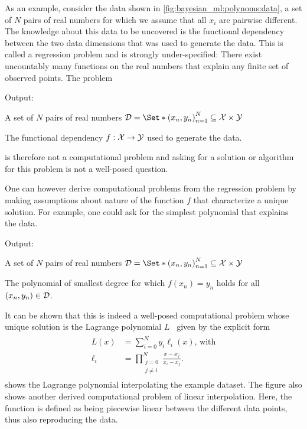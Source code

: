 As an example, consider the data shown in \cref{fig:bayesian_ml:polynoms:data}, a set of $N$ pairs of real numbers for which we assume that all $x_i$ are pairwise different.
The knowledge about this data to be uncovered is the functional dependency between the two data dimensions that was used to generate the data.
This is called a regression problem and is strongly under-specified:
There exist uncountably many functions on the real numbers that explain any finite set of observed points.
The problem
\begin{problem}[Regression]
\label{prob:bayesian_ml:regression}
\begin{labeling}{Output:}
    \item[Input:] A set of $N$ pairs of real numbers $\Dc = \Set*{\left(x_n, y_n\right)}_{n=1}^N \subseteq \Xc \times \Yc$
    \item[Output:] The functional dependency $f : \mathcal{X} \to \mathcal{Y}$ used to generate the data.
\end{labeling}
\end{problem}
is therefore not a computational problem and asking for a solution or algorithm for this problem is not a well-posed question.

One can however derive computational problems from the regression problem by making assumptions about nature of the function $f$ that characterize a unique solution.
For example, one could ask for the simplest polynomial that explains the data.
\begin{problem}
\label{prob:bayesian_ml:lagrange}
\begin{labeling}{Output:}
    \item[Input:] A set of $N$ pairs of real numbers $\Dc = \Set*{\left(x_n, y_n\right)}_{n=1}^N \subseteq \Xc \times \Yc$
    \item[Output:] The polynomial of smallest degree for which $f(x_n) = y_n$ holds for all $(x_n, y_n) \in \mathcal{D}$.
\end{labeling}
\end{problem}
It can be shown that this is indeed a well-posed computational problem whose unique solution is the Lagrange polynomial $L$~\parencite{waring_vii._1779} given by the explicit form
\begin{align}
    \begin{split}
        L(x) &= \sum_{i=0}^N y_i \ell_i(x)\text{, with} \\
        \ell_i &= \prod_{\substack{j = 0\\j \neq i}}^N \frac{x - x_j}{x_i - x_j}.
    \end{split}
    \label{eq:bayesian_ml:lagrange}
\end{align}
 shows the Lagrange polynomial interpolating the example dataset.
The figure also shows another derived computational problem of linear interpolation.
Here, the function is defined as being piecewise linear between the different data points, thus also reproducing the data.

